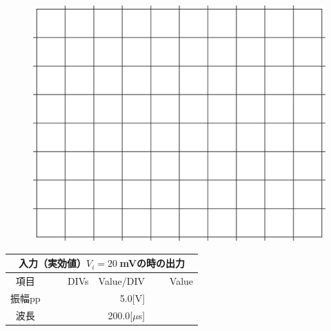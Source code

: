 \documentclass[uplatex,a4paper,11pt,oneside,openany]{jsbook}
\begin{document}
\begin{multicols}{2}
  \begin{figure}[H]
     \centering
      \includegraphics[keepaspectratio, scale=0.28, angle=0]
                  {figs/eps/grid.eps}
                  \label{fig:grid20mV}
  \end{figure}

  \begin{spacing}{1.5}
  \begin{tabular}{|c||r|r|r|}
    \multicolumn{4}{c}{入力（実効値）$V_i=20\;$mVの時の出力} \\ \hline
    項目 & DIVs & Value/DIV & Value \\ \hline \hline
    振幅pp & 　　　　 & 5.0[V]& 　　　　 \\ \hline
    波長 & 　　　　 & 200.0[$\mu$s]& 　　　　 \\ \hline
  \end{tabular}
\end{spacing}
\end{multicols}

\vfill
\newpage
\end{document}
